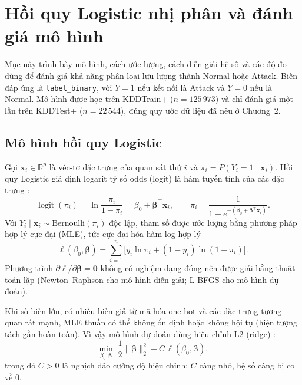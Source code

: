 \documentclass[../main.tex]{subfiles}
\begin{document}
\section{Hồi quy Logistic nhị phân và đánh giá mô hình}
\label{sec:t4:method}

Mục này trình bày mô hình, cách ước lượng, cách diễn giải hệ số và các độ đo dùng để đánh giá khả năng phân loại lưu lượng thành Normal hoặc Attack. Biến đáp ứng là \texttt{label\_binary}, với $Y=1$ nếu kết nối là Attack và $Y=0$ nếu là Normal. Mô hình được học trên KDDTrain+ ($n=125\,973$) và chỉ đánh giá một lần trên KDDTest+ ($n=22\,544$), đúng quy ước dữ liệu đã nêu ở Chương~2.

\subsection{Mô hình hồi quy Logistic}
Gọi $\mathbf{x}_i\in\mathbb{R}^p$ là véc-tơ đặc trưng của quan sát thứ $i$ và $\pi_i=P(Y_i=1\mid\mathbf{x}_i)$. Hồi quy Logistic giả định logarit tỷ số odds (logit) là hàm tuyến tính của các đặc trưng \cite{task4_hosmer2013,task4_agresti2013}:
\begin{equation}
\operatorname{logit}(\pi_i)=\ln\frac{\pi_i}{1-\pi_i}=\beta_0+\boldsymbol{\beta}^{\top}\mathbf{x}_i,
\qquad
\pi_i=\frac{1}{1+e^{-(\beta_0+\boldsymbol{\beta}^{\top}\mathbf{x}_i)}}.
\label{eq:t4:logit}
\end{equation}
Với $Y_i\mid\mathbf{x}_i\sim\text{Bernoulli}(\pi_i)$ độc lập, tham số được ước lượng bằng phương pháp hợp lý cực đại (MLE), tức cực đại hóa hàm log-hợp lý
\begin{equation}
\ell(\beta_0,\boldsymbol{\beta})=\sum_{i=1}^{n}\Big[y_i\ln\pi_i+(1-y_i)\ln(1-\pi_i)\Big].
\label{eq:t4:loglik}
\end{equation}
Phương trình $\partial\ell/\partial\boldsymbol\beta=\mathbf{0}$ không có nghiệm dạng đóng nên được giải bằng thuật toán lặp (Newton--Raphson cho mô hình diễn giải; L-BFGS cho mô hình dự đoán).

Khi số biến lớn, có nhiều biến giả từ mã hóa one-hot và các đặc trưng tương quan rất mạnh, MLE thuần có thể không ổn định hoặc không hội tụ (hiện tượng tách gần hoàn toàn). Vì vậy mô hình dự đoán dùng hiệu chỉnh L2 (ridge) \cite{task4_hastie2009,task4_sklearn2011}:
\begin{equation}
\min_{\beta_0,\boldsymbol\beta}\;\frac{1}{2}\lVert\boldsymbol\beta\rVert_2^2-C\,\ell(\beta_0,\boldsymbol\beta),
\label{eq:t4:l2}
\end{equation}
trong đó $C>0$ là nghịch đảo cường độ hiệu chỉnh: $C$ càng nhỏ, hệ số càng bị co về 0.
\end{document}
